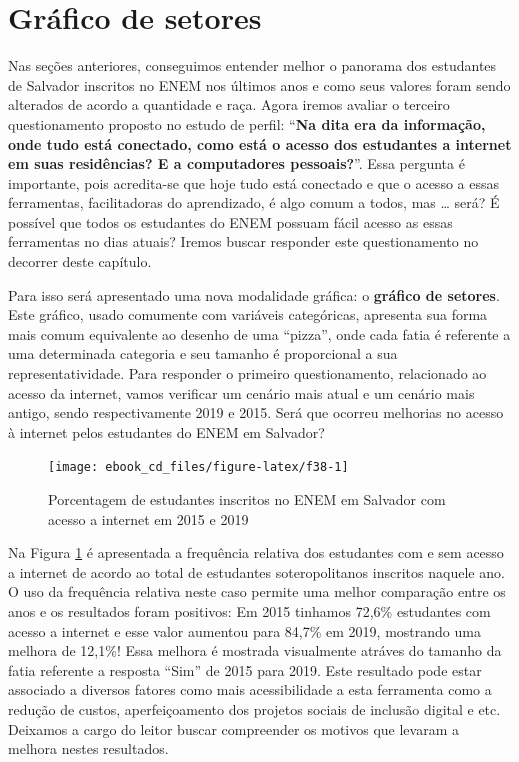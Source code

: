 \documentclass[
  portuguese,
  oneside]{book}
\begin{document}
\hypertarget{gset}{%
\section{Gráfico de setores}\label{gset}}

Nas seções anteriores, conseguimos entender melhor o panorama dos estudantes de Salvador inscritos no ENEM nos últimos anos e como seus valores foram sendo alterados de acordo a quantidade e raça. Agora iremos avaliar o terceiro questionamento proposto no estudo de perfil: ``\textbf{Na dita era da informação, onde tudo está conectado, como está o acesso dos estudantes a internet em suas residências? E a computadores pessoais?}''. Essa pergunta é importante, pois acredita-se que hoje tudo está conectado e que o acesso a essas ferramentas, facilitadoras do aprendizado, é algo comum a todos, mas \ldots{} será? É possível que todos os estudantes do ENEM possuam fácil acesso as essas ferramentas no dias atuais? Iremos buscar responder este questionamento no decorrer deste capítulo.

Para isso será apresentado uma nova modalidade gráfica: o \textbf{gráfico de setores}. Este gráfico, usado comumente com variáveis categóricas, apresenta sua forma mais comum equivalente ao desenho de uma ``pizza'', onde cada fatia é referente a uma determinada categoria e seu tamanho é proporcional a sua representatividade. Para responder o primeiro questionamento, relacionado ao acesso da internet, vamos verificar um cenário mais atual e um cenário mais antigo, sendo respectivamente 2019 e 2015. Será que ocorreu melhorias no acesso à internet pelos estudantes do ENEM em Salvador?

\begin{figure}

{\centering \texttt{[image: ebook\_cd\_files/figure-latex/f38-1]} 

}

\caption{Porcentagem de estudantes inscritos no ENEM em Salvador com acesso a internet em 2015 e 2019}\label{fig:f38}
\end{figure}

Na Figura \ref{fig:f38} é apresentada a frequência relativa dos estudantes com e sem acesso a internet de acordo ao total de estudantes soteropolitanos inscritos naquele ano. O uso da frequência relativa neste caso permite uma melhor comparação entre os anos e os resultados foram positivos: Em 2015 tinhamos 72,6\% estudantes com acesso a internet e esse valor aumentou para 84,7\% em 2019, mostrando uma melhora de 12,1\%! Essa melhora é mostrada visualmente atráves do tamanho da fatia referente a resposta ``Sim'' de 2015 para 2019. Este resultado pode estar associado a diversos fatores como mais acessibilidade a esta ferramenta como a redução de custos, aperfeiçoamento dos projetos sociais de inclusão digital e etc. Deixamos a cargo do leitor buscar compreender os motivos que levaram a melhora nestes resultados.
\end{document}

